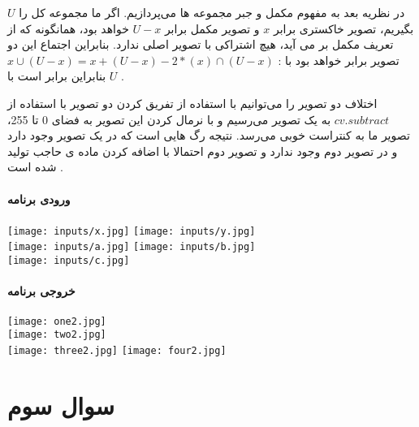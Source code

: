 \documentclass[12pt]{article}
\begin{document}
 در نظریه بعد به مفهوم مکمل و جبر مجموعه ها می‌پردازیم. 
 اگر ما مجموعه کل را $‌U$ بگیریم، تصویر خاکستری برابر $x$ و تصویر مکمل برابر $U-x$ خواهد بود، همانگونه که از تعریف مکمل بر می آید، هیچ اشتراکی با تصویر اصلی ندارد. بنابراین اجتماع این دو تصویر برابر خواهد بود با :
 $x \cup (U-x) = x + (U-x) -2* (x) \cap (U-x)$
 بنابراین برابر است با $U$ . 
 
 اختلاف دو تصویر را می‌توانیم با استفاده از تفریق کردن دو تصویر با استفاده از 
 $cv.subtract$
 به یک تصویر می‌رسیم و با نرمال کردن این تصویر به فضای 0 تا 255، تصویر ما به کنتراست خوبی می‌رسد. نتیجه رگ هایی است که در یک تصویر وجود دارد و در تصویر دوم وجود ندارد و تصویر دوم احتمالا با اضافه کردن ماده ی حاجب تولید شده است .
 


  \paragraph{ورودی برنامه}
  \texttt{[image: inputs/x.jpg]}
  \texttt{[image: inputs/y.jpg]}\\
  \texttt{[image: inputs/a.jpg]}
  \texttt{[image: inputs/b.jpg]}\\
  \texttt{[image: inputs/c.jpg]}
  \paragraph{خروجی برنامه}
  \texttt{[image: one2.jpg]}\\
  \texttt{[image: two2.jpg]}\\
  \texttt{[image: three2.jpg]}
  \texttt{[image: four2.jpg]}	

 	\newpage
	\section{سوال سوم}
\end{document}
